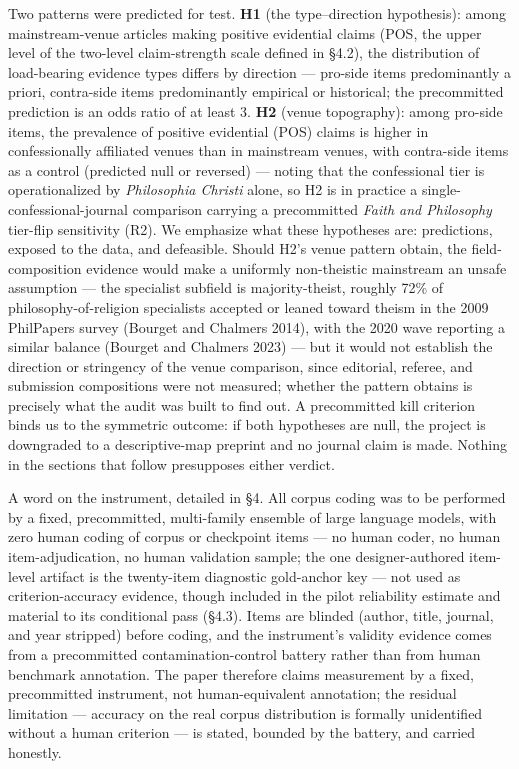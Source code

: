 Two patterns were predicted for test. \textbf{H1} (the type--direction hypothesis): among mainstream-venue articles making positive evidential claims (POS, the upper level of the two-level claim-strength scale defined in \S{}4.2), the distribution of load-bearing evidence types differs by direction --- pro-side items predominantly a priori, contra-side items predominantly empirical or historical; the precommitted prediction is an odds ratio of at least 3. \textbf{H2} (venue topography): among pro-side items, the prevalence of positive evidential (POS) claims is higher in confessionally affiliated venues than in mainstream venues, with contra-side items as a control (predicted null or reversed) --- noting that the confessional tier is operationalized by \emph{Philosophia Christi} alone, so H2 is in practice a single-confessional-journal comparison carrying a precommitted \emph{Faith and Philosophy} tier-flip sensitivity (R2). We emphasize what these hypotheses are: predictions, exposed to the data, and defeasible. Should H2's venue pattern obtain, the field-composition evidence would make a uniformly non-theistic mainstream an unsafe assumption --- the specialist subfield is majority-theist, roughly 72\% of philosophy-of-religion specialists accepted or leaned toward theism in the 2009 PhilPapers survey (Bourget and Chalmers 2014), with the 2020 wave reporting a similar balance (Bourget and Chalmers 2023) --- but it would not establish the direction or stringency of the venue comparison, since editorial, referee, and submission compositions were not measured; whether the pattern obtains is precisely what the audit was built to find out. A precommitted kill criterion binds us to the symmetric outcome: if both hypotheses are null, the project is downgraded to a descriptive-map preprint and no journal claim is made. Nothing in the sections that follow presupposes either verdict.

A word on the instrument, detailed in \S{}4. All corpus coding was to be performed by a fixed, precommitted, multi-family ensemble of large language models, with zero human coding of corpus or checkpoint items --- no human coder, no human item-adjudication, no human validation sample; the one designer-authored item-level artifact is the twenty-item diagnostic gold-anchor key --- not used as criterion-accuracy evidence, though included in the pilot reliability estimate and material to its conditional pass (\S{}4.3). Items are blinded (author, title, journal, and year stripped) before coding, and the instrument's validity evidence comes from a precommitted contamination-control battery rather than from human benchmark annotation. The paper therefore claims measurement by a fixed, precommitted instrument, not human-equivalent annotation; the residual limitation --- accuracy on the real corpus distribution is formally unidentified without a human criterion --- is stated, bounded by the battery, and carried honestly.

